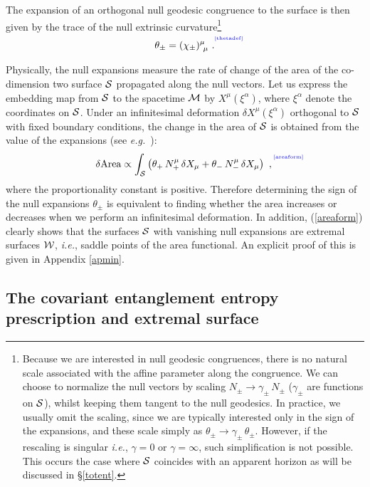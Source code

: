 \documentclass[12pt]{article}
\newcommand{\be}{\begin{equation}}
\newcommand{\ee}{\end{equation}}
\def\sec#1{\S \;\ref{#1}}
\def\req#1{(\ref{#1})}
\def\App#1{Appendix \ref{#1}}
\def\eg{{\it e.g.}}
\def\ie{{\it i.e.}}
\def\CS{{\cal S}}
\def\CW{{\cal W}}
\def\Label#1{\label{#1}%
{ \color{blue}{\smash{\hbox to0pt{\raise2ex\hbox{\tiny[#1]}\hss}}}}}
\def\bulk{{\cal M}}
\def\ms{\CS}
\def\Gms{\CW}
\def\ap{\alpha}
\begin{document}
The expansion of an orthogonal null geodesic congruence to the
surface is then given by the trace of the null extrinsic
curvature\footnote{Because we are interested in null geodesic
congruences, there is no natural scale associated with the affine
parameter along the congruence.  We can choose to normalize the null
vectors by scaling $N_\pm \to \gamma_\pm\, N_\pm$  ($\gamma_\pm$ are
functions on $\ms$), whilst keeping them tangent to the null
geodesics. In practice, we usually omit the scaling, since we are
typically interested only in the sign of the expansions, and these
scale simply as $\theta_{\pm}\to \gamma_{\pm}\, \theta_{\pm}$.
However, if the rescaling is singular \ie, $\gamma=0$ or
$\gamma=\infty$, such simplification is not possible. This occurs
the case where $\ms$ coincides with an apparent horizon as will be
discussed in \sec{totent}.}
%
\begin{equation}
\theta_\pm = (\chi_\pm)_{\ \mu}^\mu \ .
\Label{thetadef}
\end{equation}
%

Physically, the null expansions measure the rate of change of the
area of the co-dimension two surface $\ms$
 propagated along the null vectors. Let us express
 the embedding map from $\ms$ to the spacetime $\bulk$ by
 $X^\mu(\xi^\ap)$, where $\xi^\ap$ denote the coordinates on $\ms$.
 Under an infinitesimal deformation $\delta X^\mu(\xi^\ap)$
orthogonal to $\ms$ with fixed boundary conditions,
the change in the area of $\ms$  is obtained from the value of
 the expansions (see \eg\ \cite{Senovilla:2004dc}):
%
\be \delta \mbox{Area}\propto
\int_{\ms} \left(\theta_+ \,  N_+^\mu \, \delta X_\mu +\theta_- \,
N_-^\mu \, \delta X_\mu\right) \ ,
\Label{areaform}
\ee
%
where the proportionality constant is positive. Therefore
determining the sign of the null expansions $\theta_\pm$ is
equivalent to finding whether the area increases or decreases when
we perform an infinitesimal deformation. In addition, \req{areaform}
clearly shows that the surfaces $\ms$ with vanishing null expansions
are extremal surfaces $\Gms$, \ie, saddle points of the area
functional. An explicit proof of this is given in \App{apmin}.


\subsection{The covariant entanglement entropy prescription and extremal surface}
\label{covls}
\end{document}

